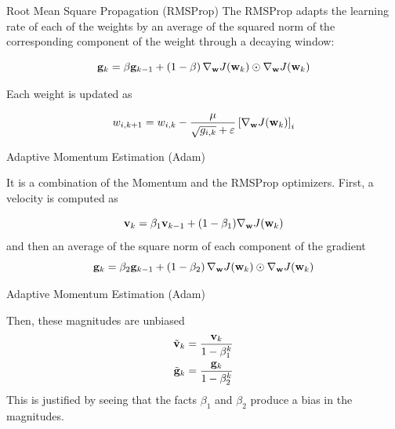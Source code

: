 \documentclass{beamer}
\begin{document}
\begin{frame}{Root Mean Square Propagation (RMSProp)}
The RMSProp adapts the learning rate of each of the weights by an average of the squared norm of the corresponding component of the weight through a decaying window:

$$
{\bf g}_k = \beta {\bf g}_{k-1} + \left(1-\beta\right) \nabla_{{\bf w}}J({\bf w}_{k}) \odot \nabla_{{\bf w}}J({\bf w}_{k})
$$

Each weight is updated as 

$$w_{i,k+1} = w_{i,k} - \frac{\mu}{\sqrt{g_{i,k}}+\varepsilon} \left[\nabla_{{\bf w}}J({\bf w}_{k})\right]_i$$

\end{frame}

\begin{frame}{Adaptive Momentum Estimation (Adam)}

It is a combination of the Momentum and the RMSProp optimizers. First, a velocity is computed as

$${\bf v}_{k} = \beta_1{\bf v}_{k-1} +(1-\beta_1) \nabla_{{\bf w}} J({\bf w}_{k}) $$
and then an average of the square norm of each component of the gradient
$${\bf g}_k = \beta_2 {\bf g}_{k-1} + \left(1-\beta_2\right) \nabla_{{\bf w}}J({\bf w}_{k}) \odot \nabla_{{\bf w}}J({\bf w}_{k})$$
\end{frame}

\begin{frame}{Adaptive Momentum Estimation (Adam)}

Then, these  magnitudes are unbiased 
\begin{equation}\nonumber
    \begin{split}
        \tilde{{\bf v}}_k & = \frac{{\bf v}_k}{1-\beta_1^{k}}\\
        \tilde{{\bf g}}_k & = \frac{{\bf g}_k}{1-\beta_2^{k}}\\
    \end{split}
\end{equation}
This is justified by seeing that the facts $\beta_1$ and $\beta_2$ produce a bias in the magnitudes.
\end{frame}
\end{document}
